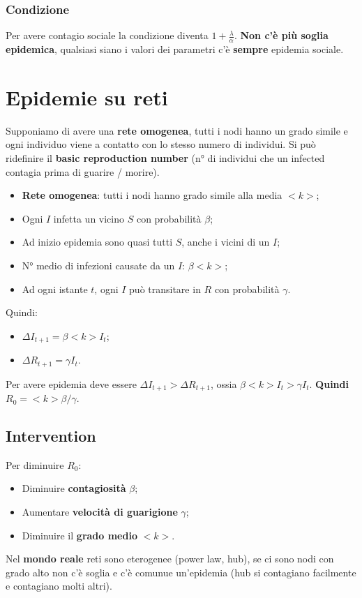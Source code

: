 \documentclass{article}
\begin{document}
    \subsubsection{Condizione}
      Per avere contagio sociale la condizione diventa $1+\frac{\lambda}{\alpha}$. \textbf{Non c'è più soglia epidemica}, qualsiasi siano i valori dei parametri c'è \textbf{sempre} epidemia sociale.
\section{Epidemie su reti}
  Supponiamo di avere una \textbf{rete omogenea}, tutti i nodi hanno un grado simile e ogni individuo viene a contatto con lo stesso numero di individui. Si può ridefinire il \textbf{basic reproduction number} (n° di individui che un infected contagia prima di guarire / morire).
  \begin{itemize}
      \item \textbf{Rete omogenea}: tutti i nodi hanno grado simile alla media $<k>$;
      \item Ogni $I$ infetta un vicino $S$ con probabilità $\beta$;
      \item Ad inizio epidemia sono quasi tutti $S$, anche i vicini di un $I$;
      \item N° medio di infezioni causate da un $I$: $\beta<k>$;
      \item Ad ogni istante $t$, ogni $I$ può transitare in $R$ con probabilità $\gamma$.
  \end{itemize}
  Quindi:
  \begin{itemize}
    \item $\Delta I_{t+1} = \beta<k>I_t$;
    \item $\Delta R_{t+1} = \gamma I_t$.
  \end{itemize}
  Per avere epidemia deve essere $\Delta I_{t+1} > \Delta R_{t+1}$, ossia $\beta<k>I_t > \gamma I_t$. \textbf{Quindi} $R_0 = <k>\beta/\gamma$.
  \subsection{Intervention}
    Per diminuire $R_0$:
    \begin{itemize}
        \item Diminuire \textbf{contagiosità} $\beta$;
        \item Aumentare \textbf{velocità di guarigione} $\gamma$;
        \item Diminuire il \textbf{grado medio} $<k>$.
    \end{itemize}
  Nel \textbf{mondo reale} reti sono eterogenee (power law, hub), se ci sono nodi con grado alto non c'è soglia e c'è comunue un'epidemia (hub si contagiano facilmente e contagiano molti altri).
\end{document}
